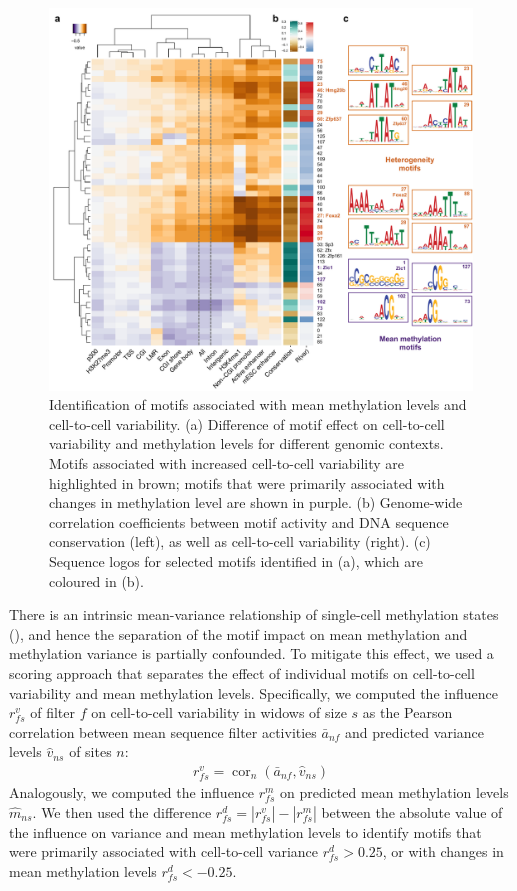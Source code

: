 \begin{figure}[htbp!]
\centering
\includegraphics[width=1.0\textwidth]{var_motifs}
\caption[Identification of motifs associated with mean methylation levels and cell-to-cell variability.]{Identification of motifs associated with mean methylation levels and cell-to-cell variability. (a) Difference of motif effect on cell-to-cell variability and methylation levels for different genomic contexts. Motifs associated with increased cell-to-cell variability are highlighted in brown; motifs that were primarily associated with changes in methylation level are shown in purple. (b) Genome-wide correlation coefficients between motif activity and DNA sequence conservation (left), as well as cell-to-cell variability (right). (c) Sequence logos for selected motifs identified in (a), which are coloured in (b).}
\label{fig:dcpg_var_motifs}
\end{figure}

There is an intrinsic mean-variance relationship of single-cell methylation states (), and hence the separation of the motif impact on mean methylation and methylation variance is partially confounded. To mitigate this effect, we used a scoring approach that separates the effect of individual motifs on cell-to-cell variability and mean methylation levels. Specifically, we computed the influence $r^v_{fs}$ of filter $f$ on cell-to-cell variability in widows of size $s$ as the Pearson correlation between mean sequence filter activities $\bar{a}_{nf}$ and predicted variance levels $\hat{v}_{ns}$ of sites $n$:
\begin{align}
  r^v_{fs}=\operatorname{cor}_n(\bar{a}_{nf},\hat{v}_{ns})
\end{align}
Analogously, we computed the influence $r^m_{fs}$ on predicted mean methylation levels $\hat{m}_{ns}$. We then used the difference $r^d_{fs}=|r^v_{fs}|-|r^m_{fs}|$ between the absolute value of the influence on variance and mean methylation levels to identify motifs that were primarily associated with cell-to-cell variance $r^d_{fs}>0.25$, or with changes in mean methylation levels $r^d_{fs}<-0.25$.

